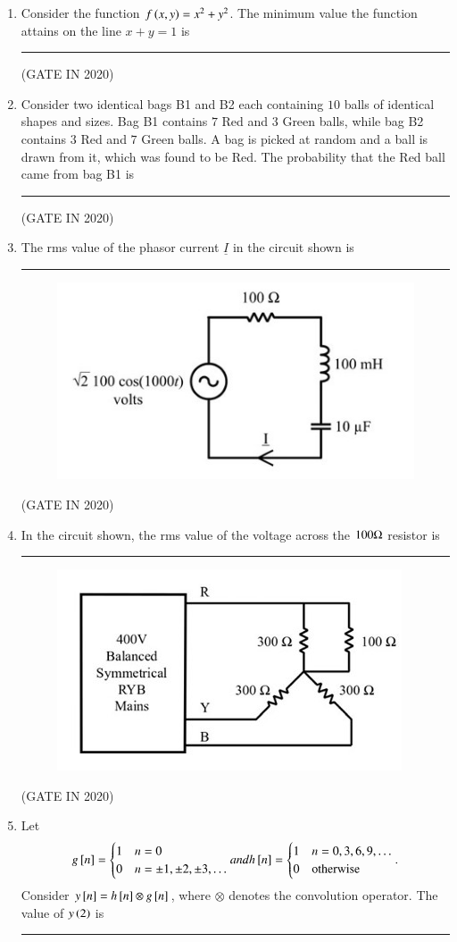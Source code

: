 \documentclass[journal,12pt,onecolumn]{IEEEtran}
\theoremstyle{remark}
\begin{document}
\begin{enumerate}
\item Consider the function $f\left(x, y\right) = x^2 + y^2$. The minimum value the function attains on the line $x + y = 1$  is \rule{2cm}{0.4pt}

\hfill{(GATE IN 2020)}

\item Consider two identical bags B1 and B2 each containing $10$ balls of identical shapes and sizes. Bag B1 contains $7$ Red and $3$ Green balls, while bag B2 contains $3$ Red and $7$ Green balls. A bag is picked at random and a ball is drawn from it, which was found to be Red. The probability that the Red ball came from bag B1  is \rule{2cm}{0.4pt}

\hfill{(GATE IN 2020)}

\item The rms value of the phasor current $\underline{I}$ in the circuit shown  is \rule{2cm}{0.4pt}
\begin{figure}[H]
\centering
\includegraphics[width=0.4\columnwidth]{figs/q14.jpg}
\caption*{}
\label{fig:q14}
\end{figure}

\hfill{(GATE IN 2020)}

\item In the circuit shown, the rms value of the voltage across the $100\ohm$ resistor  is \rule{2cm}{0.4pt}
\begin{figure}[H]
\centering
\includegraphics[width=0.4\columnwidth]{figs/q15.jpg}
\caption*{}
\label{fig:q15}
\end{figure}

\hfill{(GATE IN 2020)}

\item Let 
\begin{align*}
g{}\left[n\right] = \begin{cases} 1 & n = 0 \\ 0 & n = \pm 1, \pm 2, \pm 3, \dots \end{cases} and h{}\left[n\right] = \begin{cases} 1 & n = 0, 3, 6, 9, \dots \\ 0 & \text{otherwise} \end{cases}.
\end{align*}
Consider $y{}\left[n\right] = h{}\left[n\right] \otimes g{}\left[n\right]$, where $\otimes$ denotes the convolution operator. The value of $y\left(2\right)$ is \rule{2cm}{0.4pt}


\end{enumerate}
\end{document}
